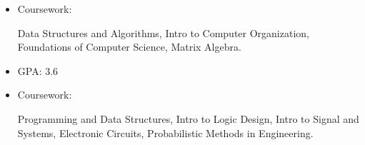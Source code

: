 \newcommand{\TUBentry}{
    \TUB
    \poswithprd{Introduction to 3D Scanning and Printing at TUB Winter University}{Jan 2018-Feb 2018}
    \begin{itemize}
        \item 
        Learned the basic of 3D scanning \& printing. Learned Blender for 3D modeling.
    \end{itemize}
}



\UM
{}
\begin{itemize}
    \item Coursework: 
    \begin{minipage}[t]{\courseworkwidth}
        Data Structures and Algorithms,
        Intro to Computer Organization,
        Foundations of Computer Science,
        Matrix Algebra.
    \end{minipage}
\end{itemize}
\vspace{\betweenEntry}

\JI
{}
\begin{itemize}
    \item GPA: 3.6
    \item Coursework:
    \begin{minipage}[t]{\courseworkwidth}
        Programming and Data Structures,
        Intro to Logic Design,
        Intro to Signal and Systems,
        Electronic Circuits,
        Probabilistic Methods in Engineering.
    \end{minipage}
\end{itemize}
